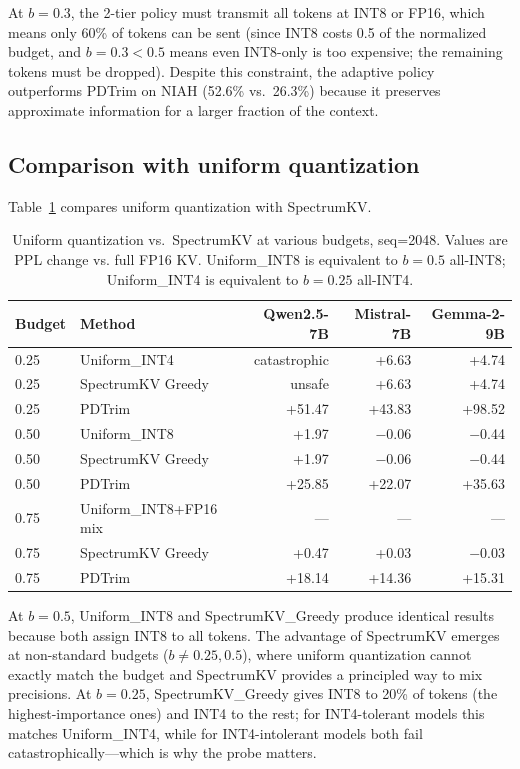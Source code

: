 \documentclass[11pt]{article}
\newcommand{\method}{SpectrumKV}
\newcommand{\budget}{b}
\newcommand{\pct}{\%}
\theoremstyle{plain}
\theoremstyle{definition}
\begin{document}
At $\budget=0.3$, the 2-tier policy must transmit all tokens at INT8 or FP16, which means only 60\pct{} of tokens can be sent (since INT8 costs 0.5 of the normalized budget, and $\budget=0.3 < 0.5$ means even INT8-only is too expensive; the remaining tokens must be dropped).  Despite this constraint, the adaptive policy outperforms PDTrim on NIAH (52.6\pct{} vs.\ 26.3\pct{}) because it preserves approximate information for a larger fraction of the context.

\subsection{Comparison with uniform quantization}
\label{sec:uniform-comparison}

Table~\ref{tab:uniform} compares uniform quantization with \method{}.

\begin{table}[t]
\centering
\caption{Uniform quantization vs.\ \method{} at various budgets, seq=2048.  Values are PPL change vs. full FP16 KV.  Uniform\_INT8 is equivalent to $\budget=0.5$ all-INT8; Uniform\_INT4 is equivalent to $\budget=0.25$ all-INT4.}
\label{tab:uniform}
\small
\begin{tabular}{llrrr}
\toprule
Budget & Method & Qwen2.5-7B & Mistral-7B & Gemma-2-9B \\
\midrule
0.25 & Uniform\_INT4 & catastrophic & +6.63 & +4.74 \\
0.25 & \method{} Greedy & unsafe & +6.63 & +4.74 \\
0.25 & PDTrim & +51.47 & +43.83 & +98.52 \\
\midrule
0.50 & Uniform\_INT8 & +1.97 & $-$0.06 & $-$0.44 \\
0.50 & \method{} Greedy & +1.97 & $-$0.06 & $-$0.44 \\
0.50 & PDTrim & +25.85 & +22.07 & +35.63 \\
\midrule
0.75 & Uniform\_INT8+FP16 mix & --- & --- & --- \\
0.75 & \method{} Greedy & +0.47 & +0.03 & $-$0.03 \\
0.75 & PDTrim & +18.14 & +14.36 & +15.31 \\
\bottomrule
\end{tabular}
\end{table}

At $\budget=0.5$, Uniform\_INT8 and \method{}\_Greedy produce identical results because both assign INT8 to all tokens.  The advantage of \method{} emerges at non-standard budgets ($\budget \ne 0.25, 0.5$), where uniform quantization cannot exactly match the budget and \method{} provides a principled way to mix precisions.  At $\budget=0.25$, \method{}\_Greedy gives INT8 to 20\pct{} of tokens (the highest-importance ones) and INT4 to the rest; for INT4-tolerant models this matches Uniform\_INT4, while for INT4-intolerant models both fail catastrophically---which is why the probe matters.
\end{document}

